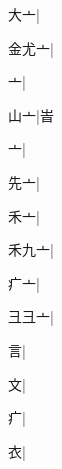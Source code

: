 \begin{multicols}{2}
{{\cjk{}{\cnsym{}　}大亠}\mktsJzrVerticalBar{}{\cjk{}{\cnsym{}　}{\cnsym{}　}{\cnsym{}　}}|{}\par
{\cjk{}金尤亠}\mktsJzrVerticalBar{}{\cjk{}{\cnsym{}　}{\cnsym{}　}{\cnsym{}　}}|{}\par
{亠}\mktsJzrVerticalBar{}{\cjk{}{\cnsym{}　}{\cnsym{}　}{\cnsym{}　}}|{}\par
{\cjk{}{\cnsym{}　}山亠}\mktsJzrVerticalBar{}{\cjk{}{\cnsym{}　}{\cnsym{}　}{\cnsym{}　}}|{\cjk{}峕}\par
{亠}\mktsJzrVerticalBar{}{\cjk{}{\cnsym{}　}{\cnsym{}　}{\cnsym{}　}}|{}\par
{先亠}\mktsJzrVerticalBar{}{\cjk{}{\cnsym{}　}{\cnsym{}　}{\cnsym{}　}}|{}\par
{\cjk{}{\cnsym{}　}禾亠}\mktsJzrVerticalBar{}{\cjk{}{\cnsym{}　}{\cnsym{}　}{\cnsym{}　}}|{}\par
{\cjk{}禾九亠}\mktsJzrVerticalBar{}{\cjk{}{\cnsym{}　}{\cnsym{}　}{\cnsym{}　}}|{}\par
{\cjk{}{\cnsym{}　}疒亠}\mktsJzrVerticalBar{}{\cjk{}{\cnsym{}　}{\cnsym{}　}{\cnsym{}　}}|{}\par
{\cjk{}彐彐亠}\mktsJzrVerticalBar{}{\cjk{}{\cnsym{}　}{\cnsym{}　}{\cnsym{}　}}|{}\par
{\cjk{}{\cnsym{}　}{\cnsym{}　}言}\mktsJzrVerticalBar{}{\cjk{}{\cnsym{}　}{\cnsym{}　}{\cnsym{}　}}|{}\par
{\cjk{}{\cnsym{}　}{\cnsym{}　}文}\mktsJzrVerticalBar{}{\cjk{}{\cnsym{}　}{\cnsym{}　}{\cnsym{}　}}|{}\par
{\cjk{}{\cnsym{}　}{\cnsym{}　}疒}\mktsJzrVerticalBar{}{\cjk{}{\cnsym{}　}{\cnsym{}　}{\cnsym{}　}}|{}\par
{\cjk{}{\cnsym{}　}{\cnsym{}　}衣}\mktsJzrVerticalBar{}{\cjk{}{\cnsym{}　}{\cnsym{}　}{\cnsym{}　}}|{}\par
}
\end{multicols}
